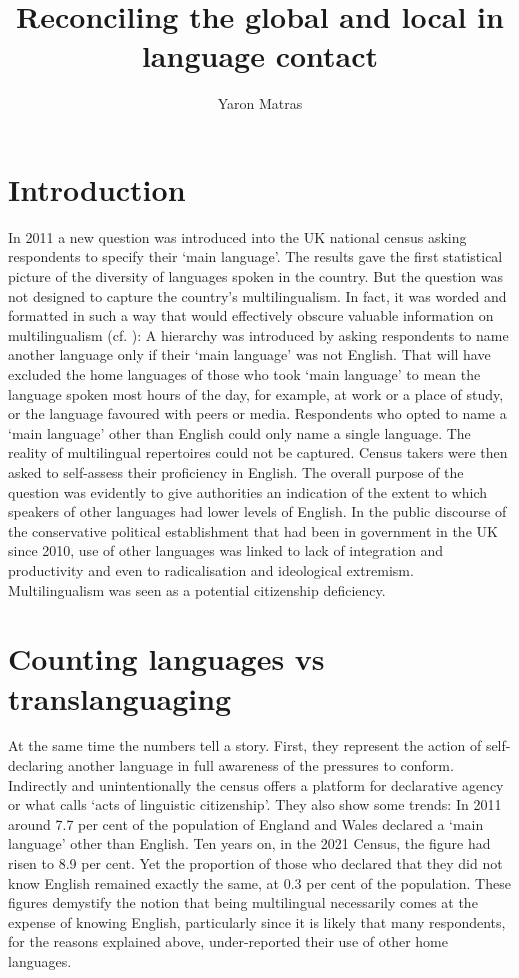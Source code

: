 \documentclass[output=paper]{langscibook}
\author{Yaron Matras \orcid{0000-0002-9840-0277} \affiliation{Aston Institute for Forensic Linguistics, Birmingham, and Department of Hebrew Language, University of Haifa}}
\title{Reconciling the global and local in language contact}
\begin{document}
\maketitle

\section{Introduction}
In 2011 a new question was introduced into the UK national census asking respondents to specify their ‘main language’. The results gave the first statistical picture of the diversity of languages spoken in the country. But the question was not designed to capture the country’s multilingualism. In fact, it was worded and formatted in such a way that would effectively obscure valuable information on multilingualism (cf. \cite{matras_multilingualism_2015}): A hierarchy was introduced by asking respondents to name another language only if their ‘main language’ was not English. That will have excluded the home languages of those who took ‘main language’ to mean the language spoken most hours of the day, for example, at work or a place of study, or the language favoured with peers or media. Respondents who opted to name a ‘main language’ other than English could only name a single language. The reality of multilingual repertoires could not be captured. Census takers were then asked to self-assess their proficiency in English. The overall purpose of the question was evidently to give authorities an indication of the extent to which speakers of other languages had lower levels of English. In the public discourse of the conservative political establishment that had been in government in the UK since 2010, use of other languages was linked to lack of integration and productivity and even to radicalisation and ideological extremism. Multilingualism was seen as a potential citizenship deficiency.


\section{Counting languages vs translanguaging}

At the same time the numbers tell a story. First, they represent the action of self-declaring another language in full awareness of the pressures to conform. Indirectly and unintentionally the census offers a platform for declarative agency or what \citet{stroud_multilingual_2018} calls ‘acts of linguistic citizenship’. They also show some trends: In 2011 around 7.7 per cent of the population of England and Wales declared a ‘main language’ other than English. Ten years on, in the 2021 Census, the figure had risen to 8.9 per cent. Yet the proportion of those who declared that they did not know English remained exactly the same, at 0.3 per cent of the population. These figures demystify the notion that being multilingual necessarily comes at the expense of knowing English, particularly since it is likely that many respondents, for the reasons explained above, under-reported their use of other home languages.
\end{document}
